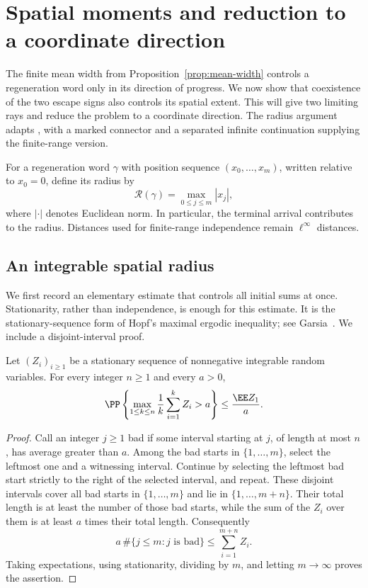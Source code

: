 \section{Spatial moments and reduction to a coordinate direction}
\label{sec:radius}

The finite mean width from Proposition~\ref{prop:mean-width} controls a
regeneration word only in its direction of progress.  We now show that
coexistence of the two escape signs also controls its spatial extent.
This will give two limiting rays and reduce the problem to a coordinate
direction.  The radius argument adapts
\cite[Proposition~3.1]{OpenAI2026}, with a marked connector and a
separated infinite continuation supplying the finite-range version.

For a regeneration word $\gamma$ with position sequence
$(x_0,\ldots,x_m)$, written relative to $x_0=0$, define its radius by
\[
  \mathcal R(\gamma)=\max_{0\le j\le m}|x_j|,
\]
where $|\cdot|$ denotes Euclidean norm.  In particular, the terminal
arrival contributes to the radius.  Distances used for finite-range
independence remain $\ell^\infty$ distances.

\subsection{An integrable spatial radius}

We first record an elementary estimate that controls all initial sums at
once.  Stationarity, rather than independence, is enough for this estimate.
It is the stationary-sequence form of Hopf's maximal ergodic inequality;
see Garsia~\cite{Garsia1965}.  We include a disjoint-interval proof.

\begin{lemma}
\label{lem:stationary-maximal}
Let $(Z_i)_{i\ge1}$ be a stationary sequence of nonnegative integrable
random variables.  For every integer $n\ge1$ and every $a>0$,
\[
  \PP\left\{\max_{1\le k\le n}\frac1k\sum_{i=1}^k Z_i>a\right\}
  \le \frac{\EE Z_1}{a}.
\]
\end{lemma}

\begin{proof}
Call an integer $j\ge1$ bad if some interval starting at $j$, of length
at most $n$, has average greater than $a$.  Among the bad starts in
$\{1,\ldots,m\}$, select the leftmost one and a witnessing interval.
Continue by selecting the leftmost bad start strictly to the right of
the selected interval, and repeat.  These disjoint intervals cover all
bad starts in $\{1,\ldots,m\}$ and lie in $\{1,\ldots,m+n\}$.
Their total length is at least the number of those bad starts, while
the sum of the $Z_i$ over them is at least $a$ times their total length.
Consequently
\[
  a\,\#\{j\le m:j\text{ is bad}\}\le\sum_{i=1}^{m+n}Z_i.
\]
Taking expectations, using stationarity, dividing by $m$, and letting
$m\to\infty$ proves the assertion.
\end{proof}

